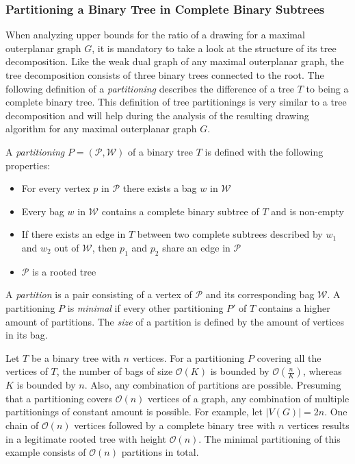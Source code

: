 \subsubsection{Partitioning a Binary Tree in Complete Binary Subtrees}
When analyzing upper bounds for the ratio of a drawing for a maximal outerplanar graph $G$, it is mandatory to take a look at the structure of its tree decomposition. Like the weak dual graph of any maximal outerplanar graph, the tree decomposition consists of three binary trees connected to the root. The following definition of a \emph{partitioning} describes the difference of a tree $T$ to being a complete binary tree. This definition of tree partitionings is very similar to a tree decomposition and will help during the analysis of the resulting drawing algorithm for any maximal outerplanar graph $G$.
\begin{definition}
	A \emph{partitioning} $P = (\mathcal{P},\mathcal{W})$ of a binary tree $T$ is defined with the following properties:
	\begin{itemize}
		\item For every vertex $p$ in $\mathcal{P}$ there exists a bag $w$ in $\mathcal{W}$
		\item Every bag $w$ in $\mathcal{W}$ contains a complete binary subtree of $T$ and is non-empty
		\item If there exists an edge in $T$ between two complete subtrees described by $w_1$ and $w_2$ out of $\mathcal{W}$, then $p_1$ and $p_2$ share an edge in $\mathcal{P}$
		\item $\mathcal{P}$ is a rooted tree		
	\end{itemize}
	A \emph{partition} is a pair consisting of a vertex of $\mathcal{P}$ and its corresponding bag $\mathcal{W}$. A partitioning $P$ is \emph{minimal} if every other partitioning $P'$ of $T$ contains a higher amount of partitions. The \emph{size} of a partition is defined by the amount of vertices in its bag.
\end{definition}
Let $T$ be a binary tree with $n$ vertices. For a partitioning $P$ covering all the vertices of $T$, the number of bags of size $\mathcal{O}(K)$ is bounded by $\mathcal{O}(\frac{n}{K})$, whereas $K$ is bounded by $n$. Also, any combination of partitions are possible. Presuming that a partitioning covers $\mathcal{O}(n)$ vertices of a graph, any combination of multiple partitionings of constant amount is possible. For example, let $|V(G)| = 2n$. One chain of $\mathcal{O}(n)$ vertices followed by a complete binary tree with $n$ vertices results in a legitimate rooted tree with height $\mathcal{O}(n)$. The minimal partitioning of this example consists of $\mathcal{O}(n)$ partitions in total.
